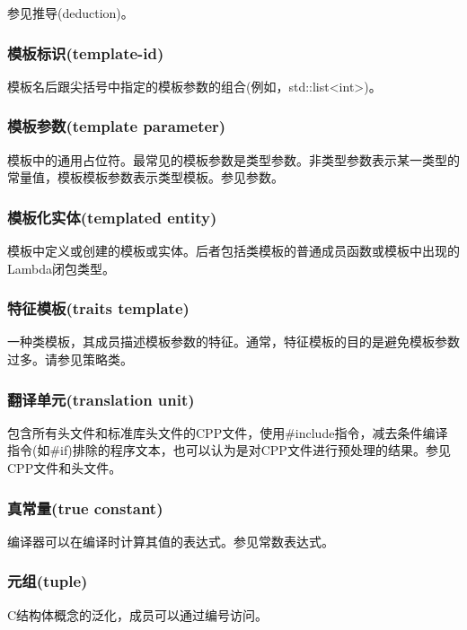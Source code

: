 参见推导(deduction)。

\subsubsection{模板标识(template-id)}

模板名后跟尖括号中指定的模板参数的组合(例如，std::list<int>)。

\subsubsection{模板参数(template parameter)}

模板中的通用占位符。最常见的模板参数是类型参数。非类型参数表示某一类型的常量值，模板模板参数表示类型模板。参见参数。

\subsubsection{模板化实体(templated entity)}

模板中定义或创建的模板或实体。后者包括类模板的普通成员函数或模板中出现的Lambda闭包类型。

\subsubsection{特征模板(traits template)}

一种类模板，其成员描述模板参数的特征。通常，特征模板的目的是避免模板参数过多。请参见策略类。

\subsubsection{翻译单元(translation unit)}

包含所有头文件和标准库头文件的CPP文件，使用\#include指令，减去条件编译指令(如\#if)排除的程序文本，也可以认为是对CPP文件进行预处理的结果。参见CPP文件和头文件。

\subsubsection{真常量(true constant)}

编译器可以在编译时计算其值的表达式。参见常数表达式。

\subsubsection{元组(tuple)}

C结构体概念的泛化，成员可以通过编号访问。


